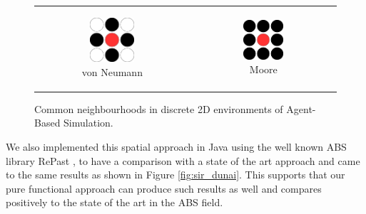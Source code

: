 \begin{figure}
\begin{center}
	\begin{tabular}{c c}
		\begin{subfigure}[b]{0.2\textwidth}
			\centering
			\includegraphics[width=0.5\textwidth, angle=0]{./fig/diagrams/neumann.png}
			\caption{von Neumann}
			\label{fig:neumann_neighbourhood}
		\end{subfigure}
    	&
		\begin{subfigure}[b]{0.2\textwidth}
			\centering
			\includegraphics[width=0.5\textwidth, angle=0]{./fig/diagrams/moore.png}
			\caption{Moore}
			\label{fig:moore_neighbourhood}
		\end{subfigure}
    \end{tabular}
	\caption{Common neighbourhoods in discrete 2D environments of Agent-Based Simulation.}
	\label{fig:abs_neighbourhoods}
\end{center}
\end{figure}

We also implemented this spatial approach in Java using the well known ABS library RePast \cite{north_complex_2013}, to have a comparison with a state of the art approach and came to the same results as shown in Figure \ref{fig:sir_dunai}. This supports that our pure functional approach can produce such results as well and compares positively to the state of the art in the ABS field.

